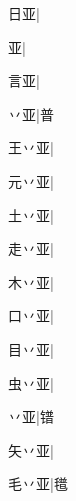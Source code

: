 \begin{multicols}{2}
{{\cjk{}{\cnsym{}　}日亚}\mktsJzrVerticalBar{}{\cjk{}{\cnsym{}　}{\cnsym{}　}{\cnsym{}　}}|{}\par
{亚}\mktsJzrVerticalBar{}{\cjk{}{\cnsym{}　}{\cnsym{}　}{\cnsym{}　}}|{}\par
{\cjk{}{\cnsym{}　}言亚}\mktsJzrVerticalBar{}{\cjk{}{\cnsym{}　}{\cnsym{}　}{\cnsym{}　}}|{}\par
{\cjk{}{\cnsym{}　}丷亚}\mktsJzrVerticalBar{}{\cjk{}{\cnsym{}　}{\cnsym{}　}{\cnsym{}　}}|{\cjk{}普}\par
{\cjk{}王丷亚}\mktsJzrVerticalBar{}{\cjk{}{\cnsym{}　}{\cnsym{}　}{\cnsym{}　}}|{}\par
{\cjk{}元丷亚}\mktsJzrVerticalBar{}{\cjk{}{\cnsym{}　}{\cnsym{}　}{\cnsym{}　}}|{}\par
{\cjk{}土丷亚}\mktsJzrVerticalBar{}{\cjk{}{\cnsym{}　}{\cnsym{}　}{\cnsym{}　}}|{}\par
{\cjk{}走丷亚}\mktsJzrVerticalBar{}{\cjk{}{\cnsym{}　}{\cnsym{}　}{\cnsym{}　}}|{}\par
{\cjk{}木丷亚}\mktsJzrVerticalBar{}{\cjk{}{\cnsym{}　}{\cnsym{}　}{\cnsym{}　}}|{}\par
{\cjk{}口丷亚}\mktsJzrVerticalBar{}{\cjk{}{\cnsym{}　}{\cnsym{}　}{\cnsym{}　}}|{}\par
{\cjk{}目丷亚}\mktsJzrVerticalBar{}{\cjk{}{\cnsym{}　}{\cnsym{}　}{\cnsym{}　}}|{}\par
{\cjk{}虫丷亚}\mktsJzrVerticalBar{}{\cjk{}{\cnsym{}　}{\cnsym{}　}{\cnsym{}　}}|{}\par
{丷亚}\mktsJzrVerticalBar{}{\cjk{}{\cnsym{}　}{\cnsym{}　}{\cnsym{}　}}|{\cjk{}镨}\par
{\cjk{}矢丷亚}\mktsJzrVerticalBar{}{\cjk{}{\cnsym{}　}{\cnsym{}　}{\cnsym{}　}}|{}\par
{\cjk{}毛丷亚}\mktsJzrVerticalBar{}{\cjk{}{\cnsym{}　}{\cnsym{}　}{\cnsym{}　}}|{\cjk{}氆}\par
}
\end{multicols}
